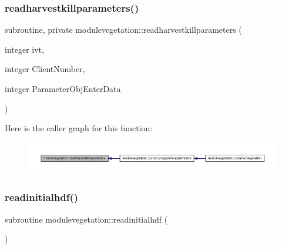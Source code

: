 \subsubsection{\texorpdfstring{readharvestkillparameters()}{readharvestkillparameters()}}
{\footnotesize\ttfamily subroutine, private modulevegetation\+::readharvestkillparameters (\begin{DoxyParamCaption}\item[{integer}]{ivt,  }\item[{integer}]{Client\+Number,  }\item[{integer}]{Parameter\+Obj\+Enter\+Data }\end{DoxyParamCaption})\hspace{0.3cm}{\ttfamily [private]}}

Here is the caller graph for this function\+:\nopagebreak
\begin{figure}[H]
\begin{center}
\leavevmode
\includegraphics[width=350pt]{namespacemodulevegetation_aec7d28b5d51b61d5ccc514ba6a645846_icgraph}
\end{center}
\end{figure}
\mbox{\label{namespacemodulevegetation_ae02d565fa46c0234360e5a9da0983414}} 
\subsubsection{\texorpdfstring{readinitialhdf()}{readinitialhdf()}}
{\footnotesize\ttfamily subroutine modulevegetation\+::readinitialhdf (\begin{DoxyParamCaption}{ }\end{DoxyParamCaption})\hspace{0.3cm}{\ttfamily [private]}}

